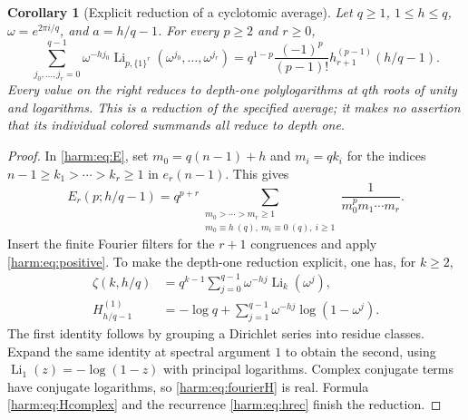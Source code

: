 \documentclass[11pt,letterpaper]{article}
\numberwithin{equation}{section}
\theoremstyle{plain}
\newtheorem{corollary}[theorem]{Corollary}
\theoremstyle{definition}
\theoremstyle{remark}
\begin{document}
\begin{corollary}[Explicit reduction of a cyclotomic average]
\label{harm:cor:cyclotomic}
Let $q\geq1$, $1\leq h\leq q$, $\omega=e^{2\pi i/q}$, and
$a=h/q-1$.  For every $p\geq2$ and $r\geq0$,
\begin{equation}\label{harm:eq:projection}
 \sum_{j_0,\ldots,j_r=0}^{q-1}\omega^{-hj_0}
 \operatorname{Li}_{p,\{1\}^r}
       (\omega^{j_0},\ldots,\omega^{j_r})
 =q^{1-p}\frac{(-1)^p}{(p-1)!}
            h_{r+1}^{(p-1)}(h/q-1).
\end{equation}
Every value on the right reduces to depth-one polylogarithms at
$q$th roots of unity and logarithms.  This is a reduction of the
specified average; it makes no assertion that its individual colored
summands all reduce to depth one.
\end{corollary}
\begin{proof}
In \eqref{harm:eq:E}, set $m_0=q(n-1)+h$ and $m_i=qk_i$ for the
indices $n-1\geq k_1>\cdots>k_r\geq1$ in $e_r(n-1)$.  This gives
\[
 E_r(p;h/q-1)=q^{p+r}
 \sum_{\substack{m_0>\cdots>m_r\geq1\\
                  m_0\equiv h\ (q),\ m_i\equiv0\ (q),\ i\geq1}}
 \frac1{m_0^p m_1\cdots m_r}.
\]
Insert the finite Fourier filters for the $r+1$ congruences and
apply \eqref{harm:eq:positive}.  To make the depth-one reduction
explicit, one has, for $k\geq2$,
\begin{align}
 \zeta(k,h/q)
 &=q^{k-1}\sum_{j=0}^{q-1}\omega^{-hj}
                       \operatorname{Li}_k(\omega^j),
                       \label{harm:eq:fourierZ}\\
 H_{h/q-1}^{(1)}
 &=-\log q+\sum_{j=1}^{q-1}\omega^{-hj}\log(1-\omega^j).
                       \label{harm:eq:fourierH}
\end{align}
The first identity follows by grouping a Dirichlet series into residue
classes.  Expand the same identity at spectral argument $1$ to obtain
the second, using $\operatorname{Li}_1(z)=-\log(1-z)$ with principal
logarithms.  Complex conjugate terms have conjugate logarithms, so
\eqref{harm:eq:fourierH} is real.  Formula \eqref{harm:eq:Hcomplex}
and the recurrence \eqref{harm:eq:hrec} finish the reduction.
\end{proof}
\end{document}
